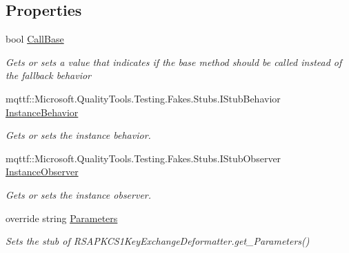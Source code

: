 \subsection*{Properties}
\begin{DoxyCompactItemize}
\item 
bool \hyperlink{class_system_1_1_security_1_1_cryptography_1_1_fakes_1_1_stub_r_s_a_p_k_c_s1_key_exchange_deformatter_a47095351991f608f3123dc84606286ac}{Call\-Base}
\begin{DoxyCompactList}\small\item\em Gets or sets a value that indicates if the base method should be called instead of the fallback behavior\end{DoxyCompactList}\item 
mqttf\-::\-Microsoft.\-Quality\-Tools.\-Testing.\-Fakes.\-Stubs.\-I\-Stub\-Behavior \hyperlink{class_system_1_1_security_1_1_cryptography_1_1_fakes_1_1_stub_r_s_a_p_k_c_s1_key_exchange_deformatter_a70b3f612c2729929760994c428d23d6a}{Instance\-Behavior}
\begin{DoxyCompactList}\small\item\em Gets or sets the instance behavior.\end{DoxyCompactList}\item 
mqttf\-::\-Microsoft.\-Quality\-Tools.\-Testing.\-Fakes.\-Stubs.\-I\-Stub\-Observer \hyperlink{class_system_1_1_security_1_1_cryptography_1_1_fakes_1_1_stub_r_s_a_p_k_c_s1_key_exchange_deformatter_a885f9414f8a55c71180b6dd2ed5516e3}{Instance\-Observer}
\begin{DoxyCompactList}\small\item\em Gets or sets the instance observer.\end{DoxyCompactList}\item 
override string \hyperlink{class_system_1_1_security_1_1_cryptography_1_1_fakes_1_1_stub_r_s_a_p_k_c_s1_key_exchange_deformatter_a73e9a896bd15c7f421ccfe99330f1323}{Parameters}
\begin{DoxyCompactList}\small\item\em Sets the stub of R\-S\-A\-P\-K\-C\-S1\-Key\-Exchange\-Deformatter.\-get\-\_\-\-Parameters()\end{DoxyCompactList}\end{DoxyCompactItemize}


